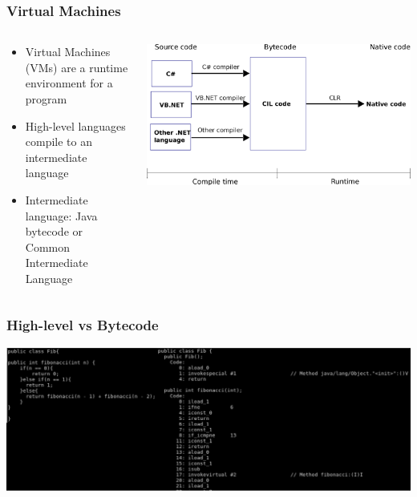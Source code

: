 \documentclass{beamer}
\begin{document}
\begin{frame}
  \frametitle{Virtual Machines}
  
  \begin{columns}
  \begin{column}{0.6\textwidth}
  \begin{itemize}
	\item Virtual Machines (VMs) are a runtime environment for a program
	\item High-level languages compile to an intermediate language
	\item Intermediate language: Java bytecode or Common Intermediate Language
  \end{itemize}
  \end{column}
  
  \begin{column}{0.5\textwidth}
  \includegraphics[width=1\textwidth]{graphics/CLR.png}
    \\
  \end{column}
  \end{columns}
\end{frame}

\begin{frame}
  \frametitle{High-level vs Bytecode}
  \includegraphics[width=1\textwidth]{graphics/FibCompair.pdf}
\end{frame}
\end{document}
